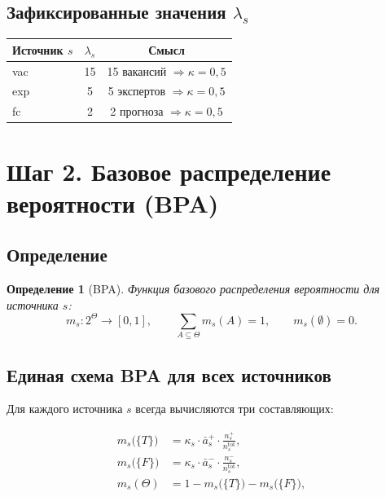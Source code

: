 \documentclass[12pt,a4paper]{article}
\newtheorem{definition}{Определение}
\begin{document}
\subsection{Зафиксированные значения $\lambda_s$}

\begin{center}
\begin{tabular}{lcc}
\toprule
Источник $s$ & $\lambda_s$ & Смысл \\
\midrule
vac & 15 & 15 вакансий $\Rightarrow \kappa = 0{,}5$ \\
exp & 5  & 5 экспертов $\Rightarrow \kappa = 0{,}5$ \\
fc  & 2  & 2 прогноза $\Rightarrow \kappa = 0{,}5$ \\
\bottomrule
\end{tabular}
\end{center}

\section{Шаг 2. Базовое распределение вероятности (BPA)}

\subsection{Определение}

\begin{definition}[BPA]
  Функция базового распределения вероятности для источника $s$:
  \[
    m_s : 2^\Theta \to [0,1],
    \qquad
    \sum_{A \subseteq \Theta} m_s(A) = 1,
    \qquad
    m_s(\emptyset) = 0.
  \]
\end{definition}

\subsection{Единая схема BPA для всех источников}

Для каждого источника $s$ всегда вычисляются три составляющих:

\begin{align}
  m_s\!\bigl(\{T\}\bigr)
    &= \kappa_s \cdot \bar{a}_s^{+} \cdot
       \frac{n_s^{+}}{n_s^{\mathrm{tot}}}, \label{eq:mT} \\[6pt]
  m_s\!\bigl(\{F\}\bigr)
    &= \kappa_s \cdot \bar{a}_s^{-} \cdot
       \frac{n_s^{-}}{n_s^{\mathrm{tot}}}, \label{eq:mF} \\[6pt]
  m_s(\Theta)
    &= 1 - m_s\!\bigl(\{T\}\bigr) - m_s\!\bigl(\{F\}\bigr), \label{eq:mU}
\end{align}
\end{document}
